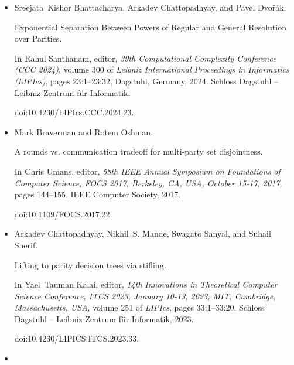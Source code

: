 \documentclass[10pt,a4paper]{article}
\begin{document}
\begin{itemize}
Supercritical space-width trade-offs for resolution.


\emph{SIAM J. Comput.}, 49(1):98–118, 2020.


doi:10.1137/16M1109072.





\item[] 
[9]

Sreejata Kishor Bhattacharya, Arkadev Chattopadhyay, and Pavel Dvořák.


Exponential Separation Between Powers of Regular and General
Resolution over Parities.


In Rahul Santhanam, editor, \emph{39th Computational Complexity
Conference (CCC 2024)}, volume 300 of \emph{Leibniz International Proceedings
in Informatics (LIPIcs)}, pages 23:1–23:32, Dagstuhl, Germany, 2024. Schloss
Dagstuhl – Leibniz-Zentrum für Informatik.


doi:10.4230/LIPIcs.CCC.2024.23.





\item[] 
[10]

Mark Braverman and Rotem Oshman.


A rounds vs. communication tradeoff for multi-party set disjointness.


In Chris Umans, editor, \emph{58th IEEE Annual Symposium on
Foundations of Computer Science, FOCS 2017, Berkeley, CA, USA, October
15-17, 2017}, pages 144–155. IEEE Computer Society, 2017.


doi:10.1109/FOCS.2017.22.





\item[] 
[11]

Arkadev Chattopadhyay, Nikhil S. Mande, Swagato Sanyal, and Suhail Sherif.


Lifting to parity decision trees via stifling.


In Yael Tauman Kalai, editor, \emph{14th Innovations in Theoretical
Computer Science Conference, ITCS 2023, January 10-13, 2023, MIT,
Cambridge, Massachusetts, USA}, volume 251 of \emph{LIPIcs}, pages
33:1–33:20. Schloss Dagstuhl – Leibniz-Zentrum für Informatik, 2023.


doi:10.4230/LIPICS.ITCS.2023.33.





\item[] 
[12]


\end{itemize}
\end{document}
